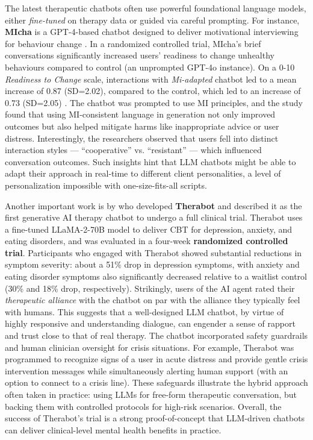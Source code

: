The latest therapeutic chatbots often use powerful foundational language models, either \emph{fine-tuned} on therapy data or guided via careful prompting. For instance, \textbf{MIcha}  is a GPT-4-based chatbot designed to deliver motivational interviewing for behaviour change \cite{Meyer2025}. In a randomized controlled trial, MIcha's brief conversations significantly increased users' readiness to change unhealthy behaviours compared to control (an unprompted GPT-4o instance). On a 0-10 \emph{Readiness to Change} \cite{BienerAbrams1991} scale, interactions with \emph{Mi-adapted} chatbot led to a mean increase of 0.87 (SD=2.02), compared to the control, which led to an increase of 0.73 (SD=2.05) \cite{Meyer2025}.
The chatbot was prompted to use MI principles, and the study found that using MI-consistent language in generation not only improved outcomes but also helped mitigate harms like inappropriate advice or user distress. Interestingly, the researchers observed that users fell into distinct interaction styles --- ``cooperative'' vs. ``resistant'' --- which influenced conversation outcomes. Such insights hint that LLM chatbots might be able to adapt their approach in real-time to different client personalities, a level of personalization impossible with one-size-fits-all scripts.

Another important work is by  \citet{doi:10.1056/AIoa2400802} who developed \textbf{Therabot} and described it as the first generative AI therapy chatbot to undergo a full clinical trial. Therabot uses a fine-tuned LLaMA-2-70B model to deliver CBT for depression, anxiety, and eating disorders, and was evaluated in a four-week \textbf{randomized controlled trial}. Participants who engaged with Therabot showed substantial reductions in symptom severity: about a 51\% drop in depression symptoms, with anxiety and eating disorder symptoms also significantly decreased relative to a waitlist control (30\% and 18\% drop, respectively). Strikingly, users of the AI agent rated their \emph{therapeutic alliance} with the chatbot on par with the alliance they typically feel with humans. This suggests that a well-designed LLM chatbot, by virtue of highly responsive and understanding dialogue, can engender a sense of rapport and trust close to that of real therapy. The chatbot incorporated safety guardrails and human clinician oversight for crisis situations. For example, Therabot was programmed to recognize signs of a user in acute distress and provide gentle crisis intervention messages while simultaneously alerting human support (with an option to connect to a crisis line). These safeguards illustrate the hybrid approach often taken in practice: using LLMs for free-form therapeutic conversation, but backing them with controlled protocols for high-risk scenarios. Overall, the success of Therabot’s trial is a strong proof-of-concept that LLM-driven chatbots can deliver clinical-level mental health benefits in practice.

